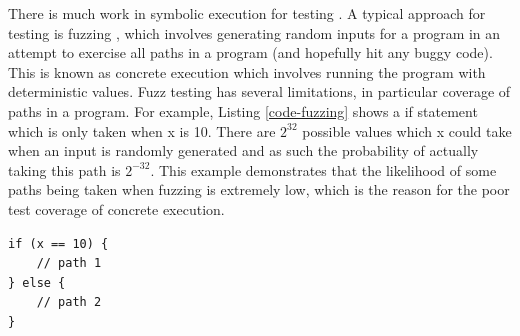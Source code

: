 \documentclass[conference]{IEEEtran}
\begin{document}
There is much work in symbolic execution for testing \cite{klee, RWset, vul-signature, system-crash, exe, bad-input, end-to-end, dyn-test, compositional-test, dart, sage, cute}. A typical approach for testing is fuzzing \cite{sage}, which involves generating random inputs for a program in an attempt to exercise all paths in a program (and hopefully hit any buggy code). This is known as concrete execution which involves running the program with deterministic values. Fuzz testing has several limitations, in particular coverage of paths in a program. For example, Listing \ref{code-fuzzing} shows a if statement which is only taken when x is 10. There are $2^{32}$ possible values which x could take when an input is randomly generated and as such the probability of actually taking this path is $2^{-32}$. This example demonstrates that the likelihood of some paths being taken when fuzzing is extremely low, which is the reason for the poor test coverage of concrete execution.





\begin{lstlisting}[style=C, label=code-fuzzing, abovecaptionskip=2ex, captionpos=b, caption={Code example where fuzzing generally has poor coverage}]
if (x == 10) {
	// path 1
} else {
	// path 2
}
\end{lstlisting}
\end{document}
